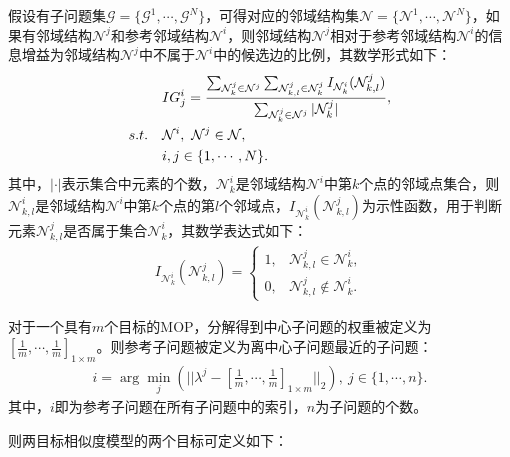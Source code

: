 \begin{definition}
    \label{def:Information Gain}
    假设有子问题集$\mathcal{G} = \{ \mathcal{G}^1, \cdots , \mathcal{G}^N \}$，可得对应的邻域结构集$\mathcal{N} = \{ \mathcal{N}^1, \cdots , \mathcal{N}^N \}$，如果有邻域结构$\mathcal{N}^j$和参考邻域结构$\mathcal{N}^i$，则邻域结构$\mathcal{N}^j$相对于参考邻域结构$\mathcal{N}^i$的信息增益为邻域结构$\mathcal{N}^j$中不属于$\mathcal{N}^i$中的候选边的比例，其数学形式如下：
    \begin{align}
        \label{eq:Information Gain}
        & IG^i_j =  \frac{\sum_{\mathcal{N}^j_k \in \mathcal{N}^j} \sum_{\mathcal{N}^j_{k,l} \in \mathcal{N}^j_k} I_{\mathcal{N}_k^i} (\mathcal{N}_{k,l}^j)}{\sum_{\mathcal{N}^j_k \in \mathcal{N}^j} |\mathcal{N}^j_k|}, \\
        s.t. \quad & \mathcal{N}^i, \ \mathcal{N}^j \in \mathcal{N}, \notag  \\
                   & i,j \in \{ 1, \cdots, N \}. \notag
    \end{align}
    其中，$|\cdot|$表示集合中元素的个数，$\mathcal{N}^i_k$是邻域结构$\mathcal{N}^i$中第$k$个点的邻域点集合，则$\mathcal{N}^i_{k,l}$是邻域结构$\mathcal{N}^i$中第$k$个点的第$l$个邻域点，$I_{\mathcal{N}_k^i} (\mathcal{N}_{k,l}^j)$为示性函数，用于判断元素$\mathcal{N}_{k,l}^j$是否属于集合$\mathcal{N}_k^i$，其数学表达式如下：
    \begin{align}
        \label{eq:示性函数}
        I_{\mathcal{N}_k^i} (\mathcal{N}_{k,l}^j) = 
        \begin{cases}
            1, & \mathcal{N}_{k,l}^j \in \mathcal{N}_k^i,     \\
            0, & \mathcal{N}_{k,l}^j \not \in \mathcal{N}_k^i.
        \end{cases}
    \end{align}
\end{definition}
\begin{definition}
    \label{def:Reference Subproblem}
    对于一个具有$m$个目标的MOP，分解得到中心子问题的权重被定义为$\left[ \frac{1}{m}, \cdots, \frac{1}{m} \right]_{1 \times m} $。则参考子问题被定义为离中心子问题最近的子问题：
    \begin{align}
        \label{eq:Reference Subproblem}
        i = \arg\min_j(|| \lambda^j - [\frac{1}{m},\cdots,\frac{1}{m}]_{1 \times m} ||_2), \ j \in \{1,\cdots,n\}.
    \end{align}
    其中，$i$即为参考子问题在所有子问题中的索引，$n$为子问题的个数。
\end{definition}
则两目标相似度模型的两个目标可定义如下：
